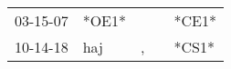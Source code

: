 \begin{supertabular}{lllll}
 03-15-07 &  *OE1* &    &   &  *CE1* \\
 10-14-18 &    haj &  , &   &  *CS1* \\
\end{supertabular}
